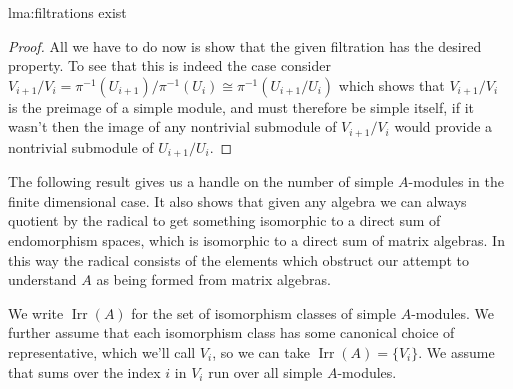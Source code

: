 \documentclass[fleqn]{NotesClass}
\newcommand{\isomorphic}{\cong}
\DeclareMathOperator{\Irr}{Irr}
\begin{document}
\begin{lma}{}{lma:filtrations exist}
\begin{proof}
            All we have to do now is show that the given filtration has the desired property.
            To see that this is indeed the case consider \(V_{i+1}/V_i = \pi^{-1}(U_{i+1})/\pi^{-1}(U_i) \isomorphic \pi^{-1}(U_{i+1}/U_i)\) which shows that \(V_{i+1}/V_i\) is the preimage of a simple module, and must therefore be simple itself, if it wasn't then the image of any nontrivial submodule of \(V_{i+1}/V_i\) would provide a nontrivial submodule of \(U_{i+1}/U_i\).
         \end{proof}
    \end{lma}
    
    The following result gives us a handle on the number of simple \(A\)-modules in the finite dimensional case.
    It also shows that given any algebra we can always quotient by the radical to get something isomorphic to a direct sum of endomorphism spaces, which is isomorphic to a direct sum of matrix algebras.
    In this way the radical consists of the elements which obstruct our attempt to understand \(A\) as being formed from matrix algebras.
    
    \begin{ntn}{}{}
        We write \(\Irr(A)\) for the set of isomorphism classes of simple \(A\)-modules.
        We further assume that each isomorphism class has some canonical choice of representative, which we'll call \(V_i\), so we can take \(\Irr(A) = \{V_i\}\).
        We assume that sums over the index \(i\) in \(V_i\) run over all simple \(A\)-modules.
    \end{ntn}
    
\end{document}
